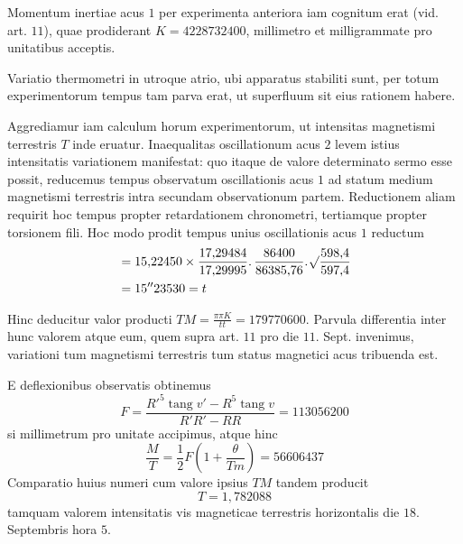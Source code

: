 \par
{}
Momentum inertiae acus $1$ per experimenta anteriora iam cognitum erat (vid. art. $11$), quae prodiderant $K=4228732400$, millimetro et milligrammate pro unitatibus acceptis.

Variatio thermometri in utroque atrio, ubi apparatus stabiliti sunt, per totum experimentorum tempus tam parva erat, ut superfluum sit eius rationem habere.

Aggrediamur iam calculum horum experimentorum, ut intensitas magnetismi terrestris $T$ inde eruatur. Inaequalitas oscillationum acus $2$ levem istius intensitatis variationem manifestat: quo itaque de valore determinato sermo esse possit, reducemus tempus observatum oscillationis acus $1$ ad statum medium magnetismi terrestris intra secundam observationum partem. Reductionem aliam requirit hoc tempus propter retardationem chronometri, tertiamque propter torsionem fili. Hoc modo prodit tempus unius oscillationis acus $1$ reductum
\[
\begin{aligned}
&=15{,}22450\times\frac{17{,}29484}{17{,}29995}\mathpunct{.}\frac{86400}{86385{,}76}\mathpunct{.}\mathord{{}^{}\!\surd}\frac{598{,}4}{597{,}4}\\
&=15''23530=t
\end{aligned}
\]

Hinc deducitur valor producti $TM=\frac{\pi\pi K}{tt}=179770600$. Parvula differentia inter hunc valorem atque eum, quem supra art. $11$ pro die $11$. Sept. invenimus, variationi tum magnetismi terrestris tum status magnetici acus tribuenda est.

E deflexionibus observatis obtinemus
\[
F=\frac{R'^5\operatorname{tang}v'-R^5\operatorname{tang}v}{R'R'-RR}=113056200
\]
si millimetrum pro unitate accipimus, atque hinc
\[
\frac MT=\frac12F\left(1+\frac{\theta}{Tm}\right)=56606437
\]
Comparatio huius numeri cum valore ipsius $TM$ tandem producit
\[
T=1{,}782088
\]
tamquam valorem intensitatis vis magneticae terrestris horizontalis die $18$. Septembris hora $5$.

